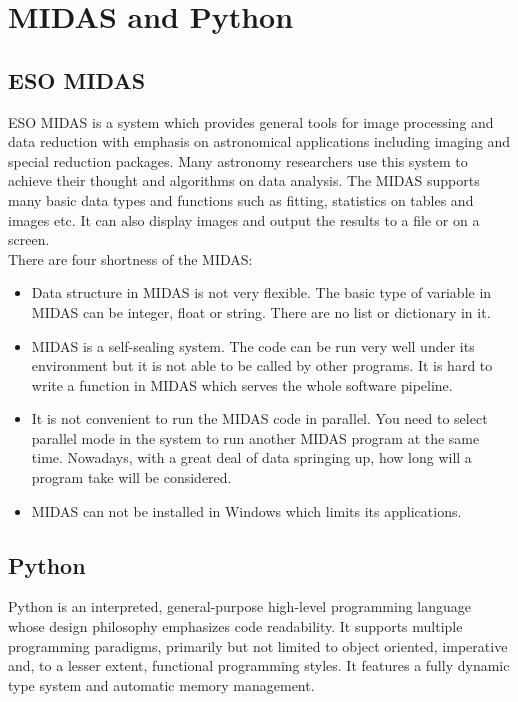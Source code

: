           \section{MIDAS and Python}
\subsection{ESO MIDAS}

ESO MIDAS is a system which provides general tools for image processing 
and data reduction with emphasis on astronomical applications including 
imaging and special reduction packages. Many astronomy researchers use 
this system to achieve their thought and algorithms on data analysis. 
The MIDAS supports many basic data types and functions such as fitting, 
statistics on tables and images etc. It can also display images 
and output the results to a file or on a screen. \\

There are four shortness of the MIDAS:
\begin{itemize}
  \item  Data structure 
in MIDAS is not very flexible. The basic type of variable in MIDAS can be 
integer, float or string. There are no list or dictionary in it. 
   \item  
MIDAS is a self-sealing system. The code can be run very well under 
its environment but it is not able to be called by other programs. It 
is hard to write a function in MIDAS which serves the whole software 
pipeline. 
   \item  It is not convenient to run the MIDAS code
 in parallel.    You need to select parallel mode in the system to run 
another MIDAS program at the same time. Nowadays, with a great deal of data
 springing up, how long will a program take will be considered.  
    \item MIDAS can not be installed in Windows which limits its
applications. 
\end{itemize}

          \subsection{Python}
Python is an interpreted, general-purpose high-level programming language 
whose design philosophy emphasizes code readability. It supports multiple 
programming paradigms, primarily but not limited to object oriented, 
imperative and, to a lesser extent, functional programming styles. It 
features a fully dynamic type system and automatic memory management. 

